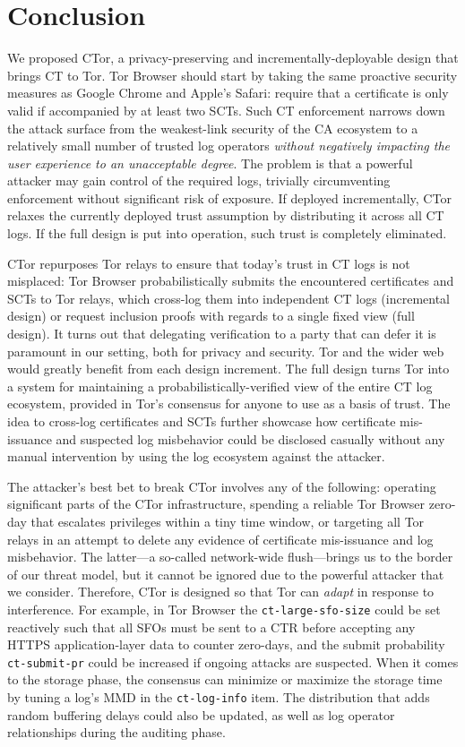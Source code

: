 \section{Conclusion} \label{sec:conclusion} 
We proposed CTor, a privacy-preserving and incrementally-deployable design that
brings CT to Tor.  Tor Browser should start by taking the same proactive
security measures as Google Chrome and Apple's Safari:
	require that a certificate is only valid if accompanied by at least two
	SCTs.
Such CT enforcement narrows down the attack surface from the weakest-link
security of the CA ecosystem to a relatively small number of trusted log
operators \emph{without negatively impacting the user experience to an
unacceptable degree}.  The problem is that a powerful attacker may gain control
of the required logs, trivially circumventing enforcement without significant
risk of exposure.  If deployed incrementally, CTor relaxes the currently
deployed trust assumption by distributing it across all CT logs.  If the full
design is put into operation, such trust is completely eliminated.

CTor repurposes Tor relays to ensure that today's trust in CT logs is not
misplaced:
	Tor Browser probabilistically submits the encountered certificates and SCTs
	to Tor relays, which
		cross-log them into independent CT logs (incremental design)
		or request inclusion proofs with regards to a single fixed view
			(full design).
It turns out that delegating verification to a party that can defer it
is paramount in our setting, both for privacy and security.  Tor and the wider
web would greatly benefit from each design increment.  The full design turns Tor
into a
system for maintaining a probabilistically-verified view of the entire CT log
ecosystem, provided in Tor's consensus for anyone to use as a basis of trust.
The idea to cross-log certificates and SCTs further showcase how certificate
mis-issuance and suspected log misbehavior could be disclosed casually without
any manual intervention by using the log ecosystem against the attacker.

The attacker's best bet to break CTor involves any of the following:
	operating significant parts of the CTor infrastructure,
	spending a reliable Tor Browser zero-day that escalates privileges within a
		tiny time window, or
	targeting all Tor relays in an attempt to delete any evidence of certificate
		mis-issuance and log misbehavior.
The latter---a so-called network-wide flush---brings us to the border of our
threat model, but it cannot be ignored due to the powerful attacker that we
consider.  Therefore, CTor is designed so that Tor can \emph{adapt} in response
to interference.  For example, in Tor Browser the \texttt{ct-large-sfo-size}
could be set reactively such that all SFOs must be sent to a CTR before
accepting any HTTPS application-layer data to counter zero-days, and the submit
probability \texttt{ct-submit-pr} could be increased if ongoing attacks are
suspected.  When it comes to the storage phase, the consensus can minimize or
maximize the storage time by tuning a log's MMD in the \texttt{ct-log-info}
item.  The distribution that adds random buffering delays could also be updated,
as well as log operator relationships during the auditing phase.
